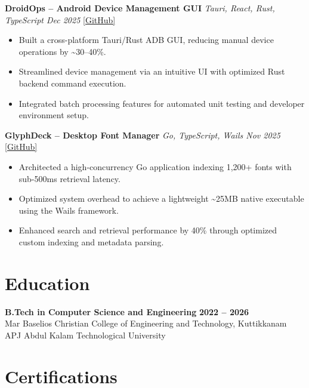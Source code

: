 \documentclass[a4paper,10pt]{article}
\begin{document}
\vspace{2pt}

\textbf{DroidOps -- Android Device Management GUI} \hfill \textit{Tauri, React, Rust, TypeScript \quad Dec 2025} \quad \href{https://github.com/your-github/droidops}{[GitHub]}
\begin{itemize}
\item Built a cross-platform Tauri/Rust ADB GUI, reducing manual device operations by \textasciitilde30--40\%.
\item Streamlined device management via an intuitive UI with optimized Rust backend command execution.
\item Integrated batch processing features for automated unit testing and developer environment setup.
\end{itemize}

\vspace{2pt}

\textbf{GlyphDeck -- Desktop Font Manager} \hfill \textit{Go, TypeScript, Wails \quad Nov 2025} \quad \href{https://github.com/your-github/GlyphDeck}{[GitHub]}
\begin{itemize}
\item Architected a high-concurrency Go application indexing 1,200+ fonts with sub-500ms retrieval latency.
\item Optimized system overhead to achieve a lightweight \textasciitilde25MB native executable using the Wails framework.
\item Enhanced search and retrieval performance by 40\% through optimized custom indexing and metadata parsing.
\end{itemize}

\section*{Education}

\textbf{B.Tech in Computer Science and Engineering} \hfill \textbf{2022 -- 2026}\\
Mar Baselios Christian College of Engineering and Technology, Kuttikkanam \hfill APJ Abdul Kalam Technological University

\section*{Certifications}
\end{document}
